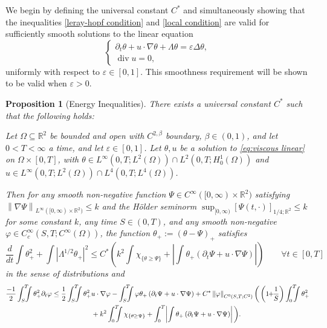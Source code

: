 \documentclass[11pt]{amsart}
\newtheorem{proposition}[theorem]{Proposition}
\theoremstyle{remark}
\theoremstyle{definition}
\newcommand{\R}{\mathbb{R}}
\newcommand{\eps}{\varepsilon}
\newcommand{\norm}[1]{\left\lVert#1\right\rVert}
\newcommand{\paren}[1]{\left( #1 \right)}
\newcommand{\bracket}[1]{\left[ #1 \right]}
\newcommand{\abs}[1]{\left\lvert #1 \right\rvert}
\newcommand{\del}{\partial}
\newcommand{\grad}{\nabla}
\newcommand{\ddt}{\frac{d}{dt}}
\renewcommand{\div}{\operatorname{div}}
\newcommand{\Laplace}{\Delta}
\newcommand{\indic}[1]{\chi_{\{#1\}}}
\newcommand{\Ctest}{C_c^\infty}
\newcommand{\Csuit}{C^\ast}
\begin{document}
We begin by defining the universal constant $\Csuit$ and simultaneously showing that the inequalities \eqref{leray-hopf condition} and \eqref{local condition} are valid for sufficiently smooth solutions to the linear equation
\begin{equation} \label{eq:viscous linear}
\begin{cases}
\del_t \theta + u \cdot \grad \theta + \Lambda \theta = \eps \Laplace \theta, \\
\div u = 0,
\end{cases}
\end{equation}
uniformly with respect to $\eps \in [0,1]$.  This smoothness requirement will be shown to be valid when $\eps > 0$.  

\begin{proposition}[Energy Inequalities] \label{thm:suitability}
There exists a universal constant $\Csuit$ such that the following holds:

Let $\Omega \subseteq \R^2$ be bounded and open with $C^{2,\beta}$ boundary, $\beta \in (0,1)$, and let $0 < T < \infty$ a time, and let $\eps \in [0,1]$.  Let $\theta, u$ be a solution to \eqref{eq:viscous linear} on $\Omega \times [0,T]$, with $\theta \in L^\infty(0,T; L^2(\Omega)) \cap L^2(0,T; H_0^1(\Omega))$ and $u \in L^\infty(0,T; L^2(\Omega)) \cap L^4(0,T; L^4(\Omega))$.  

Then for any smooth non-negative function $\Psi \in C^\infty([0,\infty)\times \R^2)$ satisfying $\norm{\grad\Psi}_{L^\infty([0,\infty)\times\R^2)} \leq k$ and the H\"{o}lder seminorm $\sup_{[0,\infty)} \bracket{\Psi(t,\cdot)}_{1/4; \R^2} \leq k$ for some constant $k$, any time $S \in (0,T)$, and any smooth non-negative $\varphi \in \Ctest(S,T;C^\infty(\Omega))$, the function $\theta_+ := \paren{\theta - \Psi}_+$ satisfies
\begin{equation}\label{leray-hopf condition}
\ddt \int \theta_+^2 + \int \abs{\Lambda^{1/2} \theta_+}^2 \leq \Csuit \paren{ k^2 \int \indic{\theta \geq \Psi} + \abs{\int \theta_+ (\del_t \Psi + u\cdot\grad\Psi)} } \qquad \forall t \in [0,T]
\end{equation}
in the sense of distributions and
\begin{equation} \label{local condition} 
\begin{aligned} 
\frac{-1}{2} \int_S^T\!\!\!\!\int \theta_+^2 \del_t \varphi &\leq \frac{1}{2} \int_S^T\!\!\!\!\int  \theta_+^2 u \cdot \grad \varphi - \int_S^T\!\!\!\!\int \varphi \theta_+ \paren{\del_t \Psi + u \cdot \grad \Psi} 
+ \Csuit \norm{\varphi}_{C^0(S,T;C^2)} \bigg( \paren{1\!\!+\!\!\frac{1}{S}} \int_0^T\!\!\!\!\int \theta_+^2 
\\ & \hskip2cm + k^2 \int_0^T\!\!\!\!\int \indic{\theta\geq\Psi} + \int_0^T\! \abs{\int \theta_+ \paren{\del_t \Psi + u\cdot\grad\Psi}} \bigg).
\end{aligned}
\end{equation}
\end{proposition}
\end{document}
